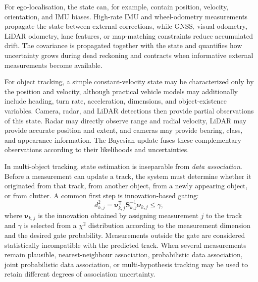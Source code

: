 \documentclass[11pt,oneside,openany]{book}
\begin{document}

For ego-localisation, the state can, for example, contain position,
velocity, orientation, and IMU biases. High-rate IMU and wheel-odometry measurements propagate the state between external corrections, while GNSS, visual odometry, LiDAR
odometry, lane features, or map-matching constraints reduce accumulated drift. The covariance is propagated together with the state and quantifies how uncertainty grows during dead reckoning and contracts when informative external measurements become available.

For object tracking, a simple constant-velocity state may be characterized only by the position and velocity, although practical vehicle models may additionally include heading, turn rate, acceleration, dimensions, and object-existence variables. Camera, radar, and LiDAR detections then provide partial observations of this state. Radar may directly observe range and radial velocity, LiDAR may provide accurate position and extent, and cameras may provide bearing, class, and appearance information. The Bayesian update fuses these complementary observations according to their likelihoods and uncertainties.

In multi-object tracking, state estimation is inseparable from
\emph{data association}. Before a measurement can update a track, the
system must determine whether it originated from that track, from
another object, from a newly appearing object, or from clutter. A common
first step is innovation-based gating:
\begin{equation}
d_{k,j}^{2}
=
\boldsymbol{\nu}_{k,j}^{\mathsf T}
\mathbf{S}_{k,j}^{-1}
\boldsymbol{\nu}_{k,j}
\leq \gamma,
\label{eq:mahalanobis_gate}
\end{equation}
where $\boldsymbol{\nu}_{k,j}$ is the innovation obtained by assigning
measurement $j$ to the track and $\gamma$ is selected from a
$\chi^2$ distribution according to the measurement dimension and the
desired gate probability. Measurements outside the gate are considered
statistically incompatible with the predicted track. When several
measurements remain plausible, nearest-neighbour association,
probabilistic data association, joint probabilistic data association,
or multi-hypothesis tracking may be used to retain different degrees of
association uncertainty.
\end{document}
